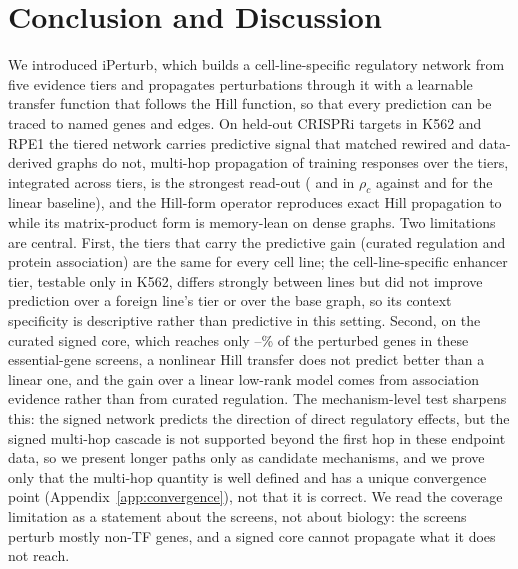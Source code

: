 \section{Conclusion and Discussion}
\label{sec:discussion}

We introduced iPerturb, which builds a cell-line-specific regulatory network from five evidence tiers and propagates perturbations through it with a learnable transfer function that follows the Hill function, so that every prediction can be traced to named genes and edges. On held-out CRISPRi targets in K562 and RPE1 the tiered network carries predictive signal that matched rewired and data-derived graphs do not, multi-hop propagation of training responses over the tiers, integrated across tiers, is the strongest read-out ( and  in $\rho_c$ against  and  for the linear baseline), and the Hill-form operator reproduces exact Hill propagation to  while its matrix-product form is memory-lean on dense graphs. Two limitations are central. First, the tiers that carry the predictive gain (curated regulation and protein association) are the same for every cell line; the cell-line-specific enhancer tier, testable only in K562, differs strongly between lines but did not improve prediction over a foreign line's tier or over the base graph, so its context specificity is descriptive rather than predictive in this setting. Second, on the curated signed core, which reaches only --\% of the perturbed genes in these essential-gene screens, a nonlinear Hill transfer does not predict better than a linear one, and the gain over a linear low-rank model comes from association evidence rather than from curated regulation. The mechanism-level test sharpens this: the signed network predicts the direction of direct regulatory effects, but the signed multi-hop cascade is not supported beyond the first hop in these endpoint data, so we present longer paths only as candidate mechanisms, and we prove only that the multi-hop quantity is well defined and has a unique convergence point (Appendix~\ref{app:convergence}), not that it is correct. We read the coverage limitation as a statement about the screens, not about biology: the screens perturb mostly non-TF genes, and a signed core cannot propagate what it does not reach.

